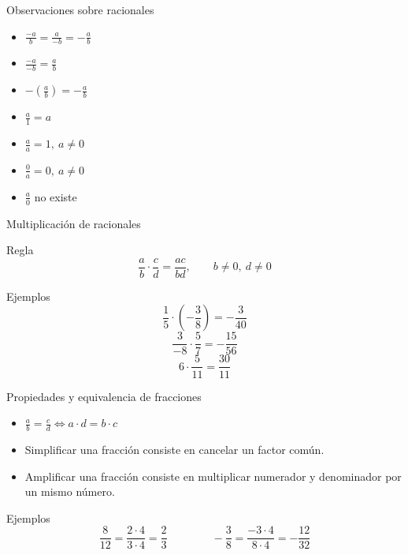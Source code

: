 \documentclass[aspectratio=169,10pt]{beamer}
\begin{document}
	\begin{frame}{Observaciones sobre racionales}
		\begin{itemize}[<+->]
			\item \(\displaystyle \frac{-a}{b}=\frac{a}{-b}=-\frac{a}{b}\)
			\item \(\displaystyle \frac{-a}{-b}=\frac{a}{b}\)
			\item \(\displaystyle -\left(\frac{a}{b}\right)=-\frac{a}{b}\)
			\item \(\displaystyle \frac{a}{1}=a\)
			\item \(\displaystyle \frac{a}{a}=1,\ a\neq0\)
			\item \(\displaystyle \frac{0}{a}=0,\ a\neq0\)
			\item \(\displaystyle \frac{a}{0}\) no existe
		\end{itemize}
	\end{frame}
	
	\begin{frame}{Multiplicación de racionales}
		\begin{block}{Regla}
			\[
			\frac{a}{b}\cdot\frac{c}{d}=\frac{ac}{bd},\qquad b\neq0,\ d\neq0
			\]
		\end{block}
		
		\begin{exampleblock}{Ejemplos}
			\[
			\frac15\cdot\left(-\frac38\right)=-\frac3{40}
			\]
			\[
			\frac3{-8}\cdot\frac57=-\frac{15}{56}
			\]
			\[
			6\cdot\frac{5}{11}=\frac{30}{11}
			\]
		\end{exampleblock}
	\end{frame}
	
	\begin{frame}{Propiedades y equivalencia de fracciones}
		\begin{itemize}[<+->]
			\item \(\displaystyle \frac{a}{b}=\frac{c}{d}\iff a\cdot d=b\cdot c\)
			\item Simplificar una fracción consiste en cancelar un factor común.
			\item Amplificar una fracción consiste en multiplicar numerador y denominador por un mismo número.
		\end{itemize}
		
		\begin{exampleblock}{Ejemplos}
			\[
			\frac{8}{12}=\frac{2\cdot4}{3\cdot4}=\frac23
			\qquad\qquad
			-\frac38=\frac{-3\cdot4}{8\cdot4}=-\frac{12}{32}
			\]
		\end{exampleblock}
	\end{frame}
	
\end{document}
